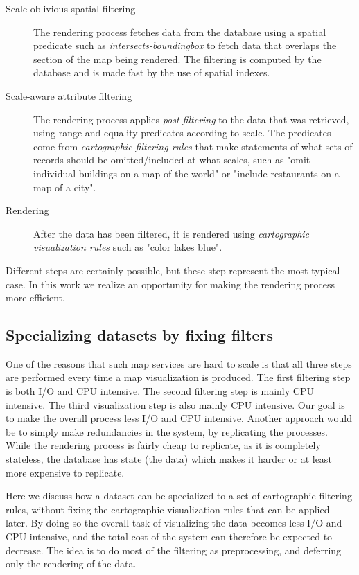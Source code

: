 \begin{description}
\item[Scale-oblivious spatial filtering] The rendering process fetches data from the database using a spatial predicate such as \emph{intersects-boundingbox} to fetch data that overlaps the section of the map being rendered. The filtering is computed by the database and is made fast by the use of spatial indexes.
\item[Scale-aware attribute filtering] The rendering process applies \emph{post-filtering} to the data that was retrieved, using range and equality predicates according to scale. The predicates come from \emph{cartographic filtering rules} that make statements of what sets of records should be omitted/included at what scales, such as "omit individual buildings on a map of the world" or "include restaurants on a map of a city".
\item[Rendering] After the data has been filtered, it is rendered using \emph{cartographic visualization rules} such as "color lakes blue".
\end{description}

Different steps are certainly possible, but these step represent the most typical case. In this work we realize an opportunity for making the rendering process more efficient. 

\subsection{Specializing datasets by fixing filters}
One of the reasons that such map services are hard to scale is that all three steps are performed every time a map visualization is produced. The first filtering step is both I/O and CPU intensive. The second filtering step is mainly CPU intensive. The third visualization step is also mainly CPU intensive. Our goal is to make the overall process less I/O and CPU intensive. Another approach would be to simply make redundancies in the system, by replicating the processes. While the rendering process is fairly cheap to replicate, as it is completely stateless, the database has state (the data) which makes it harder or at least more expensive to replicate.

Here we discuss how a dataset can be specialized to a set of cartographic filtering rules, without fixing the cartographic visualization rules that can be applied later. By doing so the overall task of visualizing the data becomes less I/O and CPU intensive, and the total cost of the system can therefore be expected to decrease. The idea is to do most of the filtering as preprocessing, and deferring only the rendering of the data.

